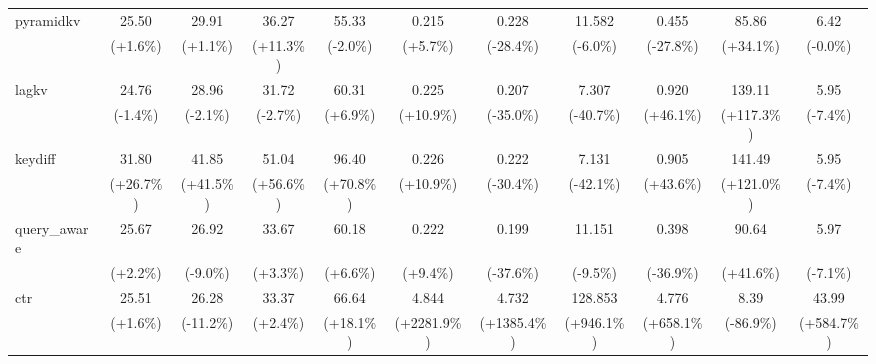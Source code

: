 \begin{table}[t]
{\begin{tabular}{l|cccccccccc}
    pyramidkv & 25.50 & 29.91 & 36.27 & 55.33 & 0.215 & 0.228 & 11.582 & 0.455 & 85.86 & 6.42 \\
     & {\tiny\color{red!70!black}(+1.6\%)} & {\tiny\color{red!70!black}(+1.1\%)} & {\tiny\color{red!70!black}(+11.3\%)} & {\tiny\color{green!60!black}(-2.0\%)} & {\tiny\color{red!70!black}(+5.7\%)} & {\tiny\color{green!60!black}(-28.4\%)} & {\tiny\color{green!60!black}(-6.0\%)} & {\tiny\color{green!60!black}(-27.8\%)} & {\tiny\color{green!60!black}(+34.1\%)} & {\tiny\color{green!60!black}(-0.0\%)} \\
    lagkv & 24.76 & 28.96 & 31.72 & 60.31 & 0.225 & 0.207 & 7.307 & 0.920 & 139.11 & 5.95 \\
     & {\tiny\color{green!60!black}(-1.4\%)} & {\tiny\color{green!60!black}(-2.1\%)} & {\tiny\color{green!60!black}(-2.7\%)} & {\tiny\color{red!70!black}(+6.9\%)} & {\tiny\color{red!70!black}(+10.9\%)} & {\tiny\color{green!60!black}(-35.0\%)} & {\tiny\color{green!60!black}(-40.7\%)} & {\tiny\color{red!70!black}(+46.1\%)} & {\tiny\color{green!60!black}(+117.3\%)} & {\tiny\color{green!60!black}(-7.4\%)} \\
    keydiff & 31.80 & 41.85 & 51.04 & 96.40 & 0.226 & 0.222 & 7.131 & 0.905 & 141.49 & 5.95 \\
     & {\tiny\color{red!70!black}(+26.7\%)} & {\tiny\color{red!70!black}(+41.5\%)} & {\tiny\color{red!70!black}(+56.6\%)} & {\tiny\color{red!70!black}(+70.8\%)} & {\tiny\color{red!70!black}(+10.9\%)} & {\tiny\color{green!60!black}(-30.4\%)} & {\tiny\color{green!60!black}(-42.1\%)} & {\tiny\color{red!70!black}(+43.6\%)} & {\tiny\color{green!60!black}(+121.0\%)} & {\tiny\color{green!60!black}(-7.4\%)} \\
    query\_aware & 25.67 & 26.92 & 33.67 & 60.18 & 0.222 & 0.199 & 11.151 & 0.398 & 90.64 & 5.97 \\
     & {\tiny\color{red!70!black}(+2.2\%)} & {\tiny\color{green!60!black}(-9.0\%)} & {\tiny\color{red!70!black}(+3.3\%)} & {\tiny\color{red!70!black}(+6.6\%)} & {\tiny\color{red!70!black}(+9.4\%)} & {\tiny\color{green!60!black}(-37.6\%)} & {\tiny\color{green!60!black}(-9.5\%)} & {\tiny\color{green!60!black}(-36.9\%)} & {\tiny\color{green!60!black}(+41.6\%)} & {\tiny\color{green!60!black}(-7.1\%)} \\
    ctr & 25.51 & 26.28 & 33.37 & 66.64 & 4.844 & 4.732 & 128.853 & 4.776 & 8.39 & 43.99 \\
     & {\tiny\color{red!70!black}(+1.6\%)} & {\tiny\color{green!60!black}(-11.2\%)} & {\tiny\color{red!70!black}(+2.4\%)} & {\tiny\color{red!70!black}(+18.1\%)} & {\tiny\color{red!70!black}(+2281.9\%)} & {\tiny\color{red!70!black}(+1385.4\%)} & {\tiny\color{red!70!black}(+946.1\%)} & {\tiny\color{red!70!black}(+658.1\%)} & {\tiny\color{red!70!black}(-86.9\%)} & {\tiny\color{red!70!black}(+584.7\%)} \\

\end{tabular}}
\end{table}

